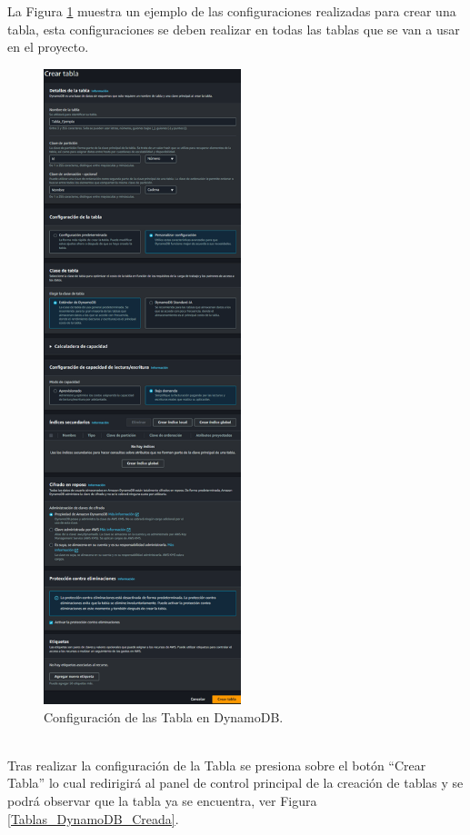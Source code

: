 \documentclass[a4paper,10pt, oneside, titlepage]{article}
\begin{document}
	\indent \indent La Figura \ref{Configuracion_Tabla_DynamoDB} muestra un ejemplo de las configuraciones realizadas para crear una tabla, esta configuraciones se deben realizar en todas las tablas que se van a usar en el proyecto.
	\begin{figure}[!h]
		\centering
		\includegraphics[width = 1\linewidth, height = 18.5cm]{Configuracion_Tabla_DynamoDB.png}
		\caption{Configuración de las Tabla en DynamoDB.}
		\label{Configuracion_Tabla_DynamoDB}
	\end{figure} \\
	\indent Tras realizar la configuración de la Tabla se presiona sobre el botón ``Crear Tabla'' lo cual redirigirá al panel de control principal de la creación de tablas y se podrá observar que la tabla ya se encuentra, ver Figura \ref{Tablas_DynamoDB_Creada}.
\end{document}
